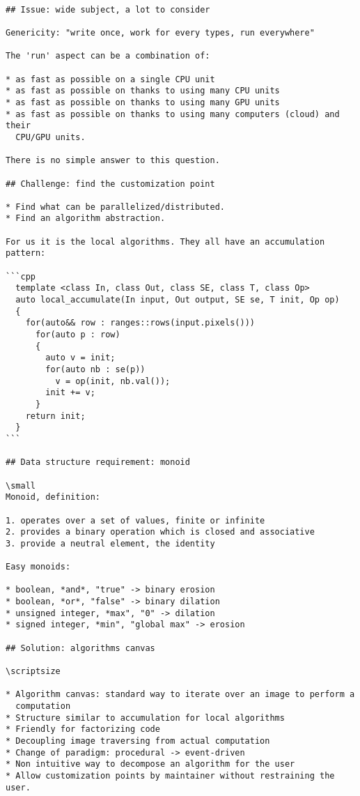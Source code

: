 
\vspace{1cm}
\begin{verbatim}

## Issue: wide subject, a lot to consider

Genericity: "write once, work for every types, run everywhere"

The 'run' aspect can be a combination of:

* as fast as possible on a single CPU unit
* as fast as possible on thanks to using many CPU units
* as fast as possible on thanks to using many GPU units
* as fast as possible on thanks to using many computers (cloud) and their
  CPU/GPU units.

There is no simple answer to this question.

## Challenge: find the customization point

* Find what can be parallelized/distributed.
* Find an algorithm abstraction.

For us it is the local algorithms. They all have an accumulation pattern:

```cpp
  template <class In, class Out, class SE, class T, class Op>
  auto local_accumulate(In input, Out output, SE se, T init, Op op)
  {
    for(auto&& row : ranges::rows(input.pixels()))
      for(auto p : row)
      {
        auto v = init;
        for(auto nb : se(p))
          v = op(init, nb.val());
        init += v;
      }
    return init;
  }
```

## Data structure requirement: monoid

\small
Monoid, definition:

1. operates over a set of values, finite or infinite
2. provides a binary operation which is closed and associative
3. provide a neutral element, the identity

Easy monoids:

* boolean, *and*, "true" -> binary erosion
* boolean, *or*, "false" -> binary dilation
* unsigned integer, *max", "0" -> dilation
* signed integer, *min", "global max" -> erosion

## Solution: algorithms canvas

\scriptsize

* Algorithm canvas: standard way to iterate over an image to perform a
  computation
* Structure similar to accumulation for local algorithms
* Friendly for factorizing code
* Decoupling image traversing from actual computation
* Change of paradigm: procedural -> event-driven
* Non intuitive way to decompose an algorithm for the user
* Allow customization points by maintainer without restraining the user.


\end{verbatim}
